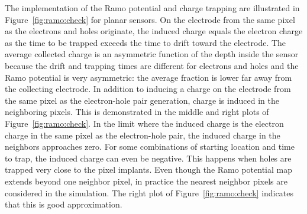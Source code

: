 The implementation of the Ramo potential and charge trapping are illustrated in Figure~\ref{fig:ramo:check} for planar sensors.  On the electrode from the same pixel as the electrons and holes originate, the induced charge equals the electron charge as the time to be trapped exceeds the time to drift toward the electrode.   The average collected charge is an asymmetric function of the depth inside the sensor because the drift and trapping times are different for electrons and holes and the Ramo potential is very asymmetric: the average fraction is lower far away from the collecting electrode.  In addition to inducing a charge on the electrode from the same pixel as the electron-hole pair generation, charge is induced in the neighboring pixels.  This is demonstrated in the middle and right plots of Figure~\ref{fig:ramo:check}.  In the limit where the induced charge is the electron charge in the same pixel as the electron-hole pair, the induced charge in the neighbors approaches zero.  For some combinations of starting location and time to trap, the induced charge can even be negative.  This happens when holes are trapped very close to the pixel implants.  Even though the Ramo potential map extends beyond one neighbor pixel, in practice the nearest neighbor pixels are considered in the simulation.  The right plot of Figure~\ref{fig:ramo:check} indicates that this is good approximation.

